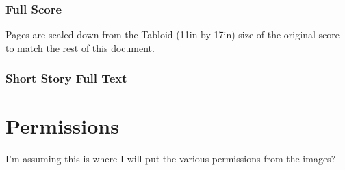 \subsection{Full Score}
Pages are scaled down from the Tabloid (11in by 17in) size of the original score to match the rest of this document. 

 

\subsection{Short Story Full Text}





\chapter{Permissions}

I'm assuming this is where I will put the various permissions from the images?


\backmatter


